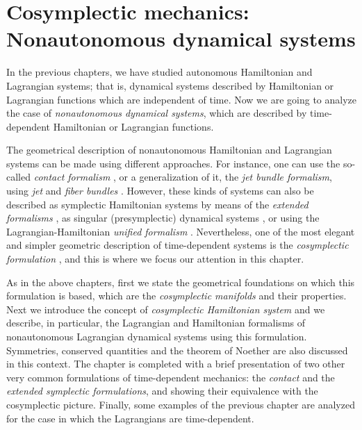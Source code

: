 \documentclass[12pt]{report}
\begin{document}



\chapter{Cosymplectic mechanics: Nonautonomous dynamical systems}
\label{chap:cosym}


In the previous chapters, we have studied autonomous Hamiltonian and Lagrangian systems;
that is, dynamical systems described by Hamiltonian or Lagrangian functions
which are independent of time.
Now we are going to analyze the case of {\sl nonautonomous
dynamical systems}, which are described by 
time-dependent Hamiltonian or Lagrangian functions.

The geometrical description of nonautonomous Hamiltonian and Lagrangian systems
can be made using different approaches.
For instance, one can use the so-called {\sl contact formalism}
\cite{AM-78,CPT-hctd,EMR-gstds,EMR-sdtc,SC-81}, or a generalization
of it, the {\sl jet bundle formalism}, using {\sl jet} and {\sl  fiber bundles}
\cite{Cr-95,EMR-gstds,MS-98,MV-03,Saunders89}.
However, these kinds of systems can also be described as symplectic
Hamiltonian systems by means of the
{\sl extended formalisms} \cite{ACI-gct,EMR-gstds,Ku-td,Ra2,Ra1,St-2005}, as singular (presymplectic) dynamical systems
 \cite{CGIR-87,EMR-gstds}, or using the Lagrangian-Hamiltonian {\sl unified formalism}  \cite{BEMMR-2008,CMC-02}.
Nevertheless, one of the most elegant and simpler geometric description
of time-dependent systems is the {\sl cosymplectic formulation}
\cite{CLL-92,CLM-91}, and this is where we focus our attention in this chapter.

As in the above chapters, first we state the geometrical foundations on which this formulation is based, which are the {\sl cosymplectic manifolds} and their properties.
Next we introduce the concept of {\sl cosymplectic Hamiltonian system}
and we describe, in particular, the Lagrangian and Hamiltonian
formalisms of nonautonomous Lagrangian dynamical systems using this formulation.
Symmetries, conserved quantities and the theorem of Noether are also discussed in this context.
The chapter is completed with a brief presentation of two 
other very common formulations of time-dependent mechanics: 
the {\sl contact} and the {\sl extended symplectic formulations}, 
and showing their equivalence with the cosymplectic picture.
Finally, some examples of the previous chapter are analyzed 
for the case in which the Lagrangians are time-dependent.
\end{document}
